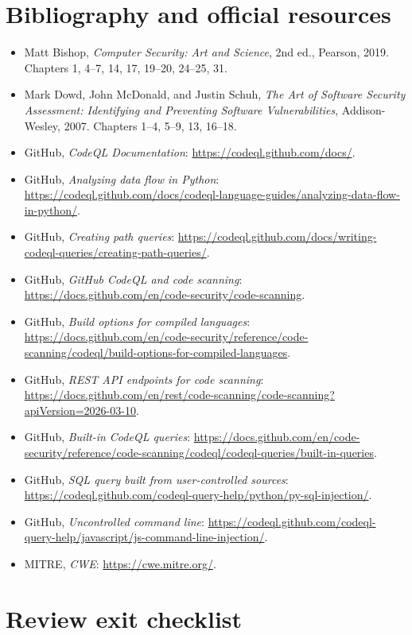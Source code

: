 \documentclass[11pt,letterpaper,oneside]{book}
\begin{document}
\section{Bibliography and official resources}

\begin{itemize}
\item Matt Bishop, \emph{Computer Security: Art and Science}, 2nd ed., Pearson, 2019. Chapters 1, 4--7, 14, 17, 19--20, 24--25, 31.
\item Mark Dowd, John McDonald, and Justin Schuh, \emph{The Art of Software Security Assessment: Identifying and Preventing Software Vulnerabilities}, Addison-Wesley, 2007. Chapters 1--4, 5--9, 13, 16--18.
\item GitHub, \emph{CodeQL Documentation}: \url{https://codeql.github.com/docs/}.
\item GitHub, \emph{Analyzing data flow in Python}: \url{https://codeql.github.com/docs/codeql-language-guides/analyzing-data-flow-in-python/}.
\item GitHub, \emph{Creating path queries}: \url{https://codeql.github.com/docs/writing-codeql-queries/creating-path-queries/}.
\item GitHub, \emph{GitHub CodeQL and code scanning}: \url{https://docs.github.com/en/code-security/code-scanning}.
\item GitHub, \emph{Build options for compiled languages}: \url{https://docs.github.com/en/code-security/reference/code-scanning/codeql/build-options-for-compiled-languages}.
\item GitHub, \emph{REST API endpoints for code scanning}: \url{https://docs.github.com/en/rest/code-scanning/code-scanning?apiVersion=2026-03-10}.
\item GitHub, \emph{Built-in CodeQL queries}: \url{https://docs.github.com/en/code-security/reference/code-scanning/codeql/codeql-queries/built-in-queries}.
\item GitHub, \emph{SQL query built from user-controlled sources}: \url{https://codeql.github.com/codeql-query-help/python/py-sql-injection/}.
\item GitHub, \emph{Uncontrolled command line}: \url{https://codeql.github.com/codeql-query-help/javascript/js-command-line-injection/}.
\item MITRE, \emph{CWE}: \url{https://cwe.mitre.org/}.
\end{itemize}

\section{Review exit checklist}
\end{document}
